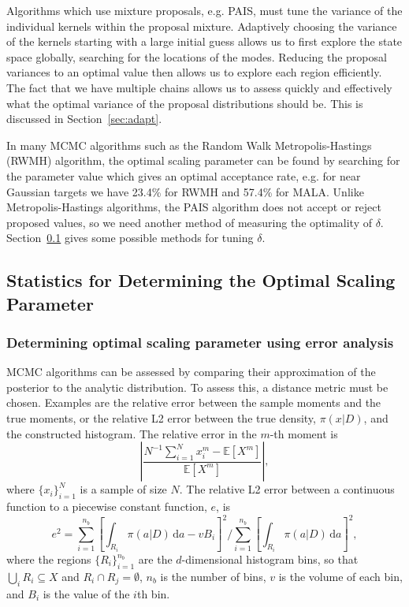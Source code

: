 \documentclass[final]{siamltex}
\begin{document}
Algorithms which use mixture proposals, e.g. PAIS, must tune the variance of the individual kernels within the proposal mixture. Adaptively choosing the variance of the kernels starting with a
large initial guess allows us to first explore the state space
globally, searching for the locations of the modes. Reducing the proposal variances to an
optimal value then allows us to explore each region efficiently. The
fact that we have multiple chains allows us to assess quickly and
effectively what the optimal variance of the proposal distributions
should be. This is discussed in Section~\ref{sec:adapt}.

In many MCMC algorithms such as the Random Walk Metropolis-Hastings (RWMH) algorithm, the optimal scaling parameter can be found by searching for the parameter value which gives an optimal acceptance rate, e.g. for near Gaussian targets we have 23.4\% for RWMH and 57.4\% for MALA\cite{roberts2001optimal}. Unlike Metropolis-Hastings algorithms, the PAIS algorithm does not accept or reject proposed values, so we need another method of measuring the optimality of $\delta$. Section~\ref{sec:statistics} gives some possible methods for tuning $\delta$.

\subsection{Statistics for Determining the Optimal Scaling Parameter}\label{sec:statistics}

\subsubsection{Determining optimal scaling parameter using error analysis}

MCMC algorithms can be assessed by comparing their approximation of the posterior to the analytic distribution. To assess this, a distance metric must be chosen. Examples are the relative error between the sample moments and the true moments, or the relative L2 error between the true density, $\pi(x|D)$, and the constructed histogram. The relative error in the $m$-th moment is
\[
	\left|\frac{N^{-1}\sum_{i=1}^N \! x_i^m - \mathbb{E}[X^m]}{\mathbb{E}[X^m]}\right|,
\]
where $\{x_i\}_{i=1}^N$ is a sample of size $N$. The relative L2 error between a continuous function to a piecewise constant function, $e$, is
\begin{equation}\label{eqn:L2_error}
	e^2 = \sum\limits_{i=1}^{n_b}\left[\displaystyle\int_{R_i} \! \pi(a|D) \, \mbox{d}a - vB_i\right]^2 \Big/ \sum\limits_{i=1}^{n_b}\left[\displaystyle\int_{R_i} \! \pi(a|D) \, \mbox{d}a\right]^2,
\end{equation}
where the regions $\{R_i\}_{i=1}^{n_b}$ are the $d$-dimensional histogram bins, so that $\bigcup_i R_i \subseteq X$ and $R_i\cap R_j=\emptyset$, $n_b$ is the number of bins, $v$ is the volume of each bin, and $B_i$ is the value of the $i$th bin. 
\end{document}
